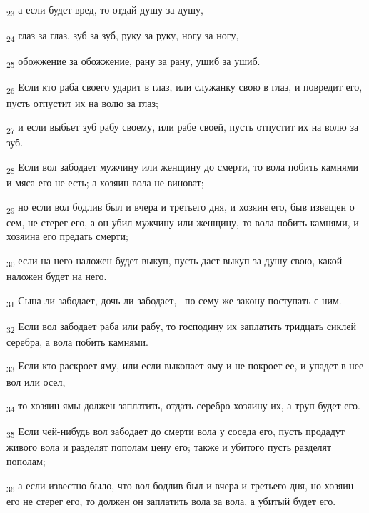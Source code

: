 \begin{tcolorbox}
\textsubscript{23} а если будет вред, то отдай душу за душу,
\end{tcolorbox}
\begin{tcolorbox}
\textsubscript{24} глаз за глаз, зуб за зуб, руку за руку, ногу за ногу,
\end{tcolorbox}
\begin{tcolorbox}
\textsubscript{25} обожжение за обожжение, рану за рану, ушиб за ушиб.
\end{tcolorbox}
\begin{tcolorbox}
\textsubscript{26} Если кто раба своего ударит в глаз, или служанку свою в глаз, и повредит его, пусть отпустит их на волю за глаз;
\end{tcolorbox}
\begin{tcolorbox}
\textsubscript{27} и если выбьет зуб рабу своему, или рабе своей, пусть отпустит их на волю за зуб.
\end{tcolorbox}
\begin{tcolorbox}
\textsubscript{28} Если вол забодает мужчину или женщину до смерти, то вола побить камнями и мяса его не есть; а хозяин вола не виноват;
\end{tcolorbox}
\begin{tcolorbox}
\textsubscript{29} но если вол бодлив был и вчера и третьего дня, и хозяин его, быв извещен о сем, не стерег его, а он убил мужчину или женщину, то вола побить камнями, и хозяина его предать смерти;
\end{tcolorbox}
\begin{tcolorbox}
\textsubscript{30} если на него наложен будет выкуп, пусть даст выкуп за душу свою, какой наложен будет на него.
\end{tcolorbox}
\begin{tcolorbox}
\textsubscript{31} Сына ли забодает, дочь ли забодает, --по сему же закону поступать с ним.
\end{tcolorbox}
\begin{tcolorbox}
\textsubscript{32} Если вол забодает раба или рабу, то господину их заплатить тридцать сиклей серебра, а вола побить камнями.
\end{tcolorbox}
\begin{tcolorbox}
\textsubscript{33} Если кто раскроет яму, или если выкопает яму и не покроет ее, и упадет в нее вол или осел,
\end{tcolorbox}
\begin{tcolorbox}
\textsubscript{34} то хозяин ямы должен заплатить, отдать серебро хозяину их, а труп будет его.
\end{tcolorbox}
\begin{tcolorbox}
\textsubscript{35} Если чей-нибудь вол забодает до смерти вола у соседа его, пусть продадут живого вола и разделят пополам цену его; также и убитого пусть разделят пополам;
\end{tcolorbox}
\begin{tcolorbox}
\textsubscript{36} а если известно было, что вол бодлив был и вчера и третьего дня, но хозяин его не стерег его, то должен он заплатить вола за вола, а убитый будет его.
\end{tcolorbox}

